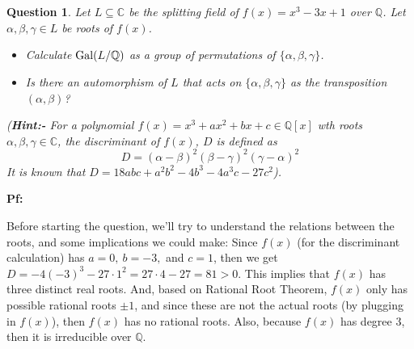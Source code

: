 \documentclass{article}
\newtheorem{question}{Question}
\newcommand{\QQ}{\mathbb{Q}}
\newcommand{\CC}{\mathbb{C}}
\newcommand{\Gal}{\textmd{Gal}}
\begin{document}
\break

\section{}%
\begin{question}\label{q2}
    Let $L\subseteq\mathbb{C}$ be the splitting field of $f(x)=x^3-3x+1$ over $\mathbb{Q}$. Let $\alpha,\beta,\gamma\in L$ be roots of $f(x)$.
    \begin{itemize}
        \item[(a)] Calculate $\Gal(L/\QQ)$ as a group of permutations of $\{\alpha,\beta,\gamma\}$.
        \item[(b)] Is there an automorphism of $L$ that acts on $\{\alpha,\beta,\gamma\}$ as the transposition $(\alpha,\beta)$?
    \end{itemize}
    (\textbf{Hint:-} For a polynomial $f(x)=x^3+ax^2+bx+c\in\QQ[x]$ wth roots $\alpha,\beta,\gamma\in \CC$, the discriminant of $f(x)$, $D$ is defined as 
    $$D=(\alpha-\beta)^2(\beta-\gamma)^2(\gamma-\alpha)^2$$
    It is known that $D=18abc+a^2b^2-4b^3-4a^3c-27c^2$).
\end{question}

\textbf{Pf:}

Before starting the question, we'll try to understand the relations between the roots, and some implications we could make: Since $f(x)$ (for the discriminant calculation) has $a=0,\ b=-3,$ and $c=1$, then we get $D=-4(-3)^3-27\cdot 1^2 = 27\cdot 4-27 = 81>0$. This implies that $f(x)$ has three distinct real roots. And, based on Rational Root Theorem, $f(x)$ only has possible rational roots $\pm 1$, and since these are not the actual roots (by plugging in $f(x)$), then $f(x)$ has no rational roots. Also, because $f(x)$ has degree $3$, then it is irreducible over $\QQ$.
\end{document}
